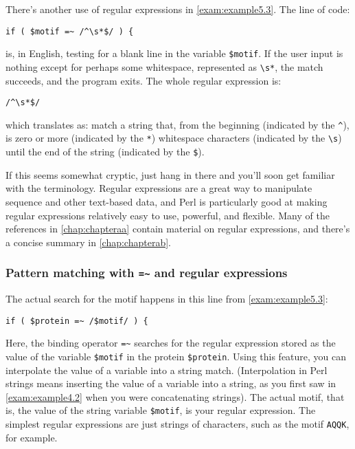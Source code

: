 There's another use of regular expressions in \autoref{exam:example5.3}. The line of code: 

\begin{lstlisting}
if ( $motif =~ /^\s*$/ ) {
\end{lstlisting}

is, in English, testing for a blank line in the variable \verb|$motif|. If the user input is nothing except for perhaps some whitespace, represented as \verb|\s*|, the match succeeds, and the program exits. The whole regular expression is: 

\begin{lstlisting}
/^\s*$/
\end{lstlisting}

which translates as: match a string that, from the beginning (indicated by the \verb|^|), is zero or more (indicated by the \verb|*|) whitespace characters (indicated by the \verb|\s|) until the end of the string (indicated by the \verb|$|).

If this seems somewhat cryptic, just hang in there and you'll soon get familiar with the terminology. Regular expressions are a great way to manipulate sequence and other text-based data, and Perl is particularly good at making regular expressions relatively easy to use, powerful, and flexible. Many of the references in \autoref{chap:chapteraa} contain material on regular expressions, and there's a concise summary in \autoref{chap:chapterab}.

\cprotect \subsubsection{Pattern matching with \verb|=~| and regular expressions}
The actual search for the motif happens in this line from \autoref{exam:example5.3}: 

\begin{lstlisting}
if ( $protein =~ /$motif/ ) {
\end{lstlisting}

Here, the binding operator \verb|=~| searches for the regular expression stored as the value of the variable \verb|$motif| in the protein \verb|$protein|. Using this feature, you can interpolate the value of a variable into a string match. (Interpolation in Perl strings means inserting the value of a variable into a string, as you first saw in \autoref{exam:example4.2} when you were concatenating strings). The actual motif, that is, the value of the string variable \verb|$motif|, is your regular expression. The simplest regular expressions are just strings of characters, such as the motif \verb|AQQK|, for example.

